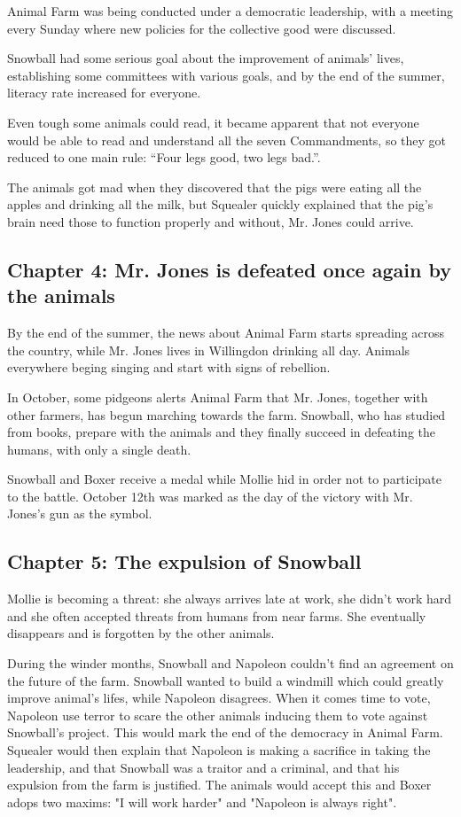 \documentclass{article}
\begin{document}
    Animal Farm was being conducted under a democratic leadership, with a meeting every Sunday where new policies for the collective good were discussed.
    
    Snowball had some serious goal about the improvement of animals' lives, establishing some committees with various goals, and by the end of the summer, literacy rate increased for everyone.

    Even tough some animals could read, it became apparent that not everyone would be able to read and understand all the seven Commandments, so they got reduced to one main rule: “Four legs good, two legs bad.”.

    The animals got mad when they discovered that the pigs were eating all the apples and drinking all the milk, but Squealer quickly explained that the pig's brain need those to function properly and without, Mr. Jones could arrive.

    \subsection{Chapter 4: Mr. Jones is defeated once again by the animals}
    By the end of the summer, the news about Animal Farm starts spreading across the country, while Mr. Jones lives in Willingdon drinking all day. Animals everywhere beging singing and start with signs of rebellion.

    In October, some pidgeons alerts Animal Farm that Mr. Jones, together with other farmers, has begun marching towards the farm. Snowball, who has studied from books, prepare with the animals and they finally succeed in defeating the humans, with only a single death.

    Snowball and Boxer receive a medal while Mollie hid in order not to participate to the battle. October 12th was marked as the day of the victory with Mr. Jones's gun as the symbol.

    \subsection{Chapter 5: The expulsion of Snowball}
    Mollie is becoming a threat: she always arrives late at work, she didn't work hard and she often accepted threats from humans from near farms. She eventually disappears and is forgotten by the other animals.

    During the winder months, Snowball and Napoleon couldn't find an agreement on the future of the farm. Snowball wanted to build a windmill which could greatly improve animal's lifes, while Napoleon disagrees. When it comes time to vote, Napoleon use terror to scare the other animals inducing them to vote against Snowball's project. This would mark the end of the democracy in Animal Farm. Squealer would then explain that Napoleon is making a sacrifice in taking the leadership, and that Snowball was a traitor and a criminal, and that his expulsion from the farm is justified. The animals would accept this and Boxer adops two maxims: "I will work harder" and "Napoleon is always right".
\end{document}
